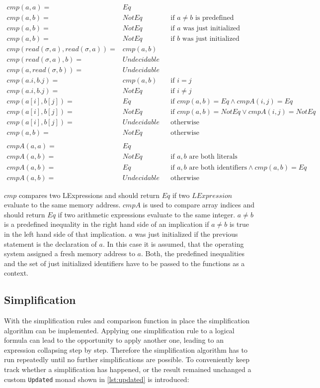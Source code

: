 \documentclass[12pt]{article}
\begin{document}
\begin{align*}
    cmp(a,a)= & Eq\\
    cmp(a,b)= & NotEq &  & \text{if }a\neq b\text{ is predefined}\\
    cmp(a,b)= & NotEq &  & \text{if }a\text{ was just initialized}\\
    cmp(a,b)= & NotEq &  & \text{if }b\text{ was just initialized}\\
    cmp(read(\sigma,a),read(\sigma,a))= & cmp(a,b)\\
    cmp(read(\sigma,a),b)= & Undecidable\\
    cmp(a,read(\sigma,b))= & Undecidable\\
    cmp(a.i,b.j)= & cmp(a,b) &  & \text{if }i=j\\
    cmp(a.i,b.j)= & NotEq &   & \text{if }i\neq j\\
    cmp(a[i],b[j])= & Eq &  & \text{if }cmp(a,b)=Eq\wedge cmpA(i,j)=Eq\\
    cmp(a[i],b[j])= & NotEq &  & \text{if }cmp(a,b)=NotEq\vee cmpA(i,j)=NotEq\\
    cmp(a[i],b[j])= & Undecidable &  & \text{otherwise}\\
    cmp(a,b)= & NotEq &  & \text{otherwise}\\
    \\
    cmpA(a,a)= & Eq\\
    cmpA(a,b)= & NotEq &  & \text{if }a,b\text{ are both literals}\\
    cmpA(a,b)= & Eq &  & \text{if }a,b\text{ are both identifiers}\wedge cmp(a,b)=Eq\\
    cmpA(a,b)= & Undecidable &  & \text{otherwise}
\end{align*}

$cmp$ compares two LExpressions and should return $Eq$ if two $LExpression$ evaluate to the same memory address.
$cmpA$ is used to compare array indices and should return $Eq$ if two arithmetic expressions evaluate to the same integer.
$a \neq b$ is a predefined inequality in the right hand side of an implication if $a \neq b$ is true in the left hand side of that implication. 
$a$ was just initialized if the previous statement is the declaration of $a$. 
In this case it is assumed, that the operating system assigned a fresh memory address to $a$.
Both, the predefined inequalities and the set of just initialized identifiers have to be passed to the functions as a context.

\subsection{Simplification}
With the simplification rules and comparison function in place the simplification algorithm can be implemented.
Applying one simplification rule to a logical formula can lead to the opportunity to apply another one, leading to an expression collapsing step by step.
Therefore the simplification algorithm has to run repeatedly until no further simplifications are possible.
To conveniently keep track whether a simplification has happened, or the result remained unchanged a custom \texttt{Updated} monad shown in \ref{lst:updated} is introduced:
\end{document}
